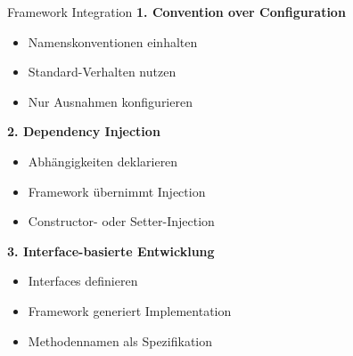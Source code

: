\begin{KR}{Framework Integration}
\textbf{1. Convention over Configuration}
\begin{itemize}
    \item Namenskonventionen einhalten
    \item Standard-Verhalten nutzen
    \item Nur Ausnahmen konfigurieren
\end{itemize}

\textbf{2. Dependency Injection}
\begin{itemize}
    \item Abhängigkeiten deklarieren
    \item Framework übernimmt Injection
    \item Constructor- oder Setter-Injection
\end{itemize}

\textbf{3. Interface-basierte Entwicklung}
\begin{itemize}
    \item Interfaces definieren
    \item Framework generiert Implementation
    \item Methodennamen als Spezifikation
\end{itemize}
\end{KR}

